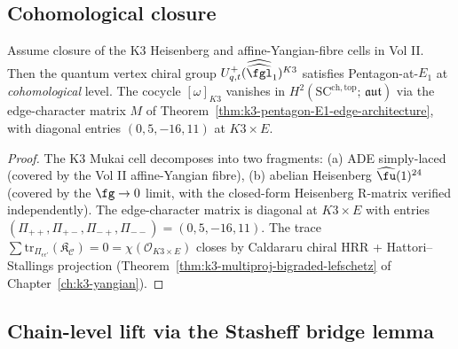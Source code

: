 \subsection{Cohomological closure}
\label{subsec:k3qt-cohomological-closure}

\begin{theorem}
\label{thm:k3qt-pentagon-cohomological}
Assume closure of the K$3$ Heisenberg and affine-Yangian-fibre cells in
Vol II. Then the quantum vertex chiral group
$U^+_{q,t}(\widehat{\widehat{\fgl}}_1)^{K3}$ satisfies Pentagon-at-$E_1$
at \emph{cohomological} level. The cocycle $[\omega]_{K3}$ vanishes in
$H^2(\mathrm{SC}^{\mathrm{ch,top}};\, \mathfrak{aut})$ via the
edge-character matrix $M$ of
Theorem~\ref{thm:k3-pentagon-E1-edge-architecture},
with diagonal entries $(0, 5, -16, 11)$ at $K3 \times E$.
\end{theorem}

\begin{proof}
The K$3$ Mukai cell decomposes into two fragments:
(a) ADE simply-laced (covered by the Vol II affine-Yangian fibre),
(b) abelian Heisenberg $\widehat{\fu}(1)^{24}$ (covered by the
$\fg \to 0$ limit, with the closed-form Heisenberg R-matrix
verified independently). The edge-character matrix is diagonal at
$K3 \times E$ with entries
$(\Pi_{++}, \Pi_{+-}, \Pi_{-+}, \Pi_{--}) = (0, 5, -16, 11)$. The
trace $\sum \mathrm{tr}_{\Pi_{\epsilon\epsilon'}}(\mathfrak{K}_{\mathcal{C}})
= 0 = \chi(\mathcal{O}_{K3 \times E})$ closes by Caldararu chiral
HRR + Hattori--Stallings projection
\textup{(}Theorem~\ref{thm:k3-multiproj-bigraded-lefschetz} of
Chapter~\ref{ch:k3-yangian}\textup{).}
\end{proof}

\subsection{Chain-level lift via the Stasheff bridge lemma}
\label{subsec:k3qt-chain-level-lift}

